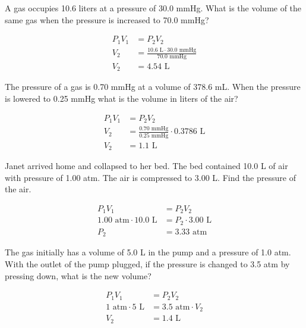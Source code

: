 \documentclass{article}
\begin{document}
\begin{custom-big}[Example 5]
A gas occupies 10.6 liters at a pressure of 30.0 mmHg. What is the volume of the same gas when the pressure is increased to 70.0 mmHg?
\end{custom-big}
\begin{solution}
\begin{align*}
    P_1V_1&=P_2V_2\\
    V_2&=\frac{10.6\text{ L}\cdot 30.0\text{ mmHg}}{70.0\text{ mmHg}}\\
    V_2&=4.54\text{ L}
\end{align*}
\end{solution}

\begin{custom-big}[Example 6]

The pressure of a gas is 0.70 mmHg at a volume of 378.6 mL. When the pressure is lowered to 0.25 mmHg what is the volume in liters of the air?
\end{custom-big}
\begin{solution}
\begin{align*}
    P_1V_1&=P_2V_2\\
    V_2&=\frac{0.70\text{ mmHg}}{0.25\text{ mmHg}}\cdot 0.3786\text{ L}\\
    V_2&=1.1\text{ L}
\end{align*}
\end{solution}



\begin{custom-big}[Example 7]
Janet arrived home and collapsed to her bed. The bed contained 10.0 L of air with pressure of 1.00 atm. The air is compressed to 3.00 L. Find the pressure of the air. 
\end{custom-big}
\begin{solution}
\begin{align*}
    P_1V_1&=P_2V_2\\
    1.00\text{ atm}\cdot 10.0\text{ L}&=P_2\cdot 3.00\text{ L}\\
    P_2&=3.33\text{ atm}
\end{align*}
\end{solution}

\begin{custom-big}[Example 8]
The gas initially has a volume of 5.0 L in the pump and a pressure of 1.0 atm. With the outlet of the pump plugged, if the pressure is changed to 3.5 atm by pressing down, what is the new volume?
\end{custom-big}
\begin{solution}
\begin{align*}
    P_1V_1&=P_2V_2\\
    1\text{ atm}\cdot 5\text{ L}&= 3.5\text{ atm} \cdot V_2\\
    V_2&=1.4\text{ L}
\end{align*}
\end{solution}
\end{document}
